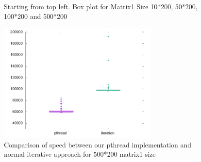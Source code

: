 \documentclass{article}
\begin{document}
\begin{figure}[htb]
\begin{tikzpicture}[
 image/.style = {text width=0.45\textwidth, 
                 inner sep=0pt, outer sep=0pt},
node distance = 5mm and 5mm
                        ]
\end{tikzpicture}
    \caption{Starting from top left. Box plot for Matrix1 Size 10*200, 50*200, 100*200 and 500*200}
\includegraphics[width=8cm]{iterationVSpthread500.png}
    \caption{Comparison of speed between our pthread implementation and normal iterative approach for 500*200 matrix1 size }
\end{figure}



{}
\end{document}
